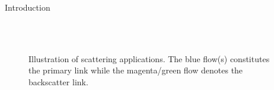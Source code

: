 \documentclass[journal]{IEEEtran}
\begin{document}
\begin{section}{Introduction}
	\begin{figure}[!t]
		\centering
		\\
		\subfloat[\gls{sr}]{
			\resizebox{0.48\linewidth}{!}{
				
			}
			\label{fg:sr}
		}
		\\
		\subfloat[RIScatter]{
			\resizebox{0.48\linewidth}{!}{
				
			}
			\label{fg:riscatter}
		}
		\caption{
			Illustration of scattering applications.
			The blue flow(s) constitutes the primary link while the magenta/green flow denotes the backscatter link.
		}
		\label{fg:scatter_illustration}
	\end{figure}


\end{section}
\end{document}
